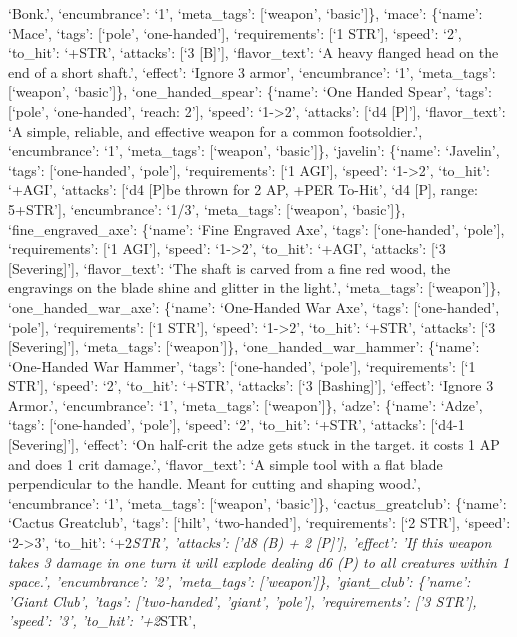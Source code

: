 \documentclass[
  letterpaper,
  DIV=11,
  numbers=noendperiod]{scrartcl}
\begin{document}
`Bonk.', `encumbrance': `1', `meta\_tags': {[}`weapon', `basic'{]}\},
`mace': \{`name': `Mace', `tags': {[}`pole', `one-handed'{]},
`requirements': {[}`1 STR'{]}, `speed': `2', `to\_hit': `+STR',
`attacks': {[}`3 {[}B{]}'{]}, `flavor\_text': `A heavy flanged head on
the end of a short shaft.', `effect': `Ignore 3 armor', `encumbrance':
`1', `meta\_tags': {[}`weapon', `basic'{]}\}, `one\_handed\_spear':
\{`name': `One Handed Spear', `tags': {[}`pole', `one-handed', `reach:
2'{]}, `speed': `1-\textgreater2', `attacks': {[}`d4 {[}P{]}'{]},
`flavor\_text': `A simple, reliable, and effective weapon for a common
footsoldier.', `encumbrance': `1', `meta\_tags': {[}`weapon',
`basic'{]}\}, `javelin': \{`name': `Javelin', `tags': {[}`one-handed',
`pole'{]}, `requirements': {[}`1 AGI'{]}, `speed': `1-\textgreater2',
`to\_hit': `+AGI', `attacks': {[}`d4 {[}P{]}\nCan be thrown for 2 AP,
+PER To-Hit', `d4 {[}P{]}, range: 5+STR'{]}, `encumbrance': `1/3',
`meta\_tags': {[}`weapon', `basic'{]}\}, `fine\_engraved\_axe':
\{`name': `Fine Engraved Axe', `tags': {[}`one-handed', `pole'{]},
`requirements': {[}`1 AGI'{]}, `speed': `1-\textgreater2', `to\_hit':
`+AGI', `attacks': {[}`3 {[}Severing{]}'{]}, `flavor\_text': `The shaft
is carved from a fine red wood, the engravings on the blade shine and
glitter in the light.', `meta\_tags': {[}`weapon'{]}\},
`one\_handed\_war\_axe': \{`name': `One-Handed War Axe', `tags':
{[}`one-handed', `pole'{]}, `requirements': {[}`1 STR'{]}, `speed':
`1-\textgreater2', `to\_hit': `+STR', `attacks': {[}`3
{[}Severing{]}'{]}, `meta\_tags': {[}`weapon'{]}\},
`one\_handed\_war\_hammer': \{`name': `One-Handed War Hammer', `tags':
{[}`one-handed', `pole'{]}, `requirements': {[}`1 STR'{]}, `speed': `2',
`to\_hit': `+STR', `attacks': {[}`3 {[}Bashing{]}'{]}, `effect': `Ignore
3 Armor.', `encumbrance': `1', `meta\_tags': {[}`weapon'{]}\}, `adze':
\{`name': `Adze', `tags': {[}`one-handed', `pole'{]}, `speed': `2',
`to\_hit': `+STR', `attacks': {[}`d4-1 {[}Severing{]}'{]}, `effect': `On
half-crit the adze gets stuck in the target. \nRemoving it costs 1 AP
and does 1 crit damage.', `flavor\_text': `A simple tool with a flat
blade perpendicular to the handle. Meant for cutting and shaping wood.',
`encumbrance': `1', `meta\_tags': {[}`weapon', `basic'{]}\},
`cactus\_greatclub': \{`name': `Cactus Greatclub', `tags': {[}`hilt',
`two-handed'{]}, `requirements': {[}`2 STR'{]}, `speed':
`2-\textgreater3', `to\_hit': `+2\emph{STR', 'attacks': {[}'d8 (B) + 2
{[}P{]}'{]}, 'effect': 'If this weapon takes 3 damage in one turn it
will explode dealing d6 (P) to all creatures within 1 space.',
'encumbrance': '2', 'meta\_tags': {[}'weapon'{]}\}, 'giant\_club':
\{'name': 'Giant Club', 'tags': {[}'two-handed', 'giant', 'pole'{]},
'requirements': {[}'3 STR'{]}, 'speed': '3', 'to\_hit': '+2}STR',
\end{document}
